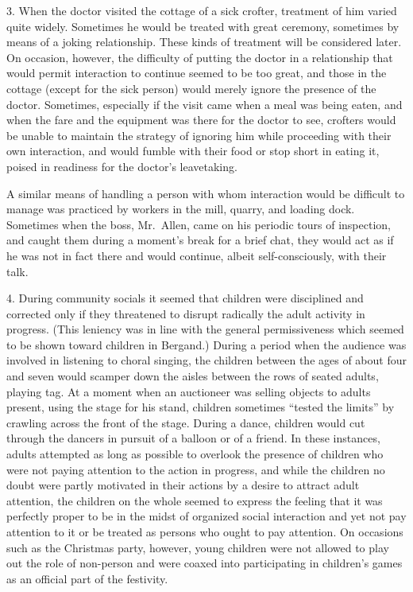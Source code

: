 \documentclass[openany,nobib]{tufte-book}
\begin{document}
3. When the doctor visited the cottage of a sick crofter, treatment of
him varied quite widely. Sometimes he would be treated with great
ceremony, sometimes by means of a joking relationship. These kinds of
treatment will be considered later. On occasion, however, the difficulty
of putting the doctor in a relationship that would permit interaction to
continue seemed to be too great, and those in the cottage (except for
the sick person) would merely ignore the presence of the doctor.
Sometimes, especially if the visit came when a meal was being eaten, and
when the fare and the equipment was there for the doctor to see,
crofters would be unable to maintain the strategy of ignoring him while
proceeding with their own interaction, and would fumble with their food
or stop short in eating it, poised in readiness for the doctor's
leavetaking.

A similar means of handling a person with whom interaction would be
difficult to manage was practiced by workers in the mill, quarry, and
loading dock. Sometimes when the boss, Mr.~Allen, came on his periodic
tours of inspection, and caught them during a moment's break for a brief
chat, they would act as if he was not in fact there and would continue,
albeit self-consciously, with their talk.

4. During community socials it seemed that children were disciplined and
corrected only if they threatened to disrupt radically the adult
activity in progress. (This leniency was in line with the general
permissiveness which seemed to be shown toward children in Bergand.)
During a period when the audience was involved in listening to choral
singing, the children between the ages of about four and seven would
scamper down the aisles between the rows of seated adults, playing tag.
At a moment when an auctioneer was selling objects to adults present,
using the stage for his stand, children sometimes ``tested the limits''
by crawling across the front of the stage. During a dance, children
would cut through the dancers in pursuit of a balloon or of a friend. In
these instances, adults attempted as long as possible to overlook the
presence of children who were not paying attention to the action in
progress, and while the children no doubt were partly motivated in their
actions by a desire to attract adult attention, the children on the
whole seemed to express the feeling that it was perfectly proper to be
in the midst of organized social interaction and yet not pay attention
to it or be treated as persons who ought to pay attention. On occasions
such as the Christmas party, however, young children were not allowed to
play out the role of non-person and were coaxed into participating in
children's games\\\noindent as an official part of the festivity.
\end{document}
